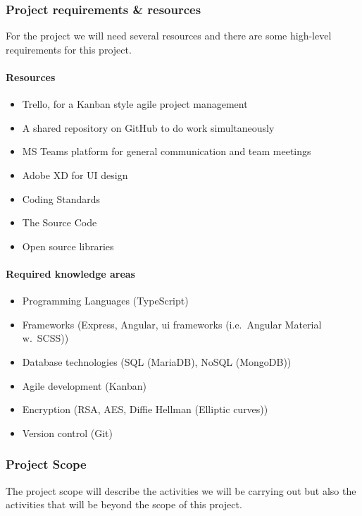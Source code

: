\subsubsection{Project requirements \& resources}

For the project we will need several resources and there are some high-level requirements for this project.

\paragraph{Resources}
\begin{itemize}
    \item Trello, for a Kanban style agile project management
    \item A shared repository on GitHub to do work simultaneously
    \item MS Teams platform for general communication and team meetings
    \item Adobe XD for UI design
    \item Coding Standards
    \item The Source Code
    \item Open source libraries
\end{itemize}

\paragraph{Required knowledge areas}
\begin{itemize}
    \item Programming Languages (TypeScript)
    \item Frameworks (Express, Angular, \ac{ui} frameworks (i.e.\ Angular Material w.\ SCSS))
    \item Database technologies (SQL (MariaDB), NoSQL (MongoDB))
    \item Agile development (Kanban)
    \item Encryption (RSA, AES, Diffie Hellman (Elliptic curves))
    \item Version control (Git)
\end{itemize}

\subsubsection{Project Scope}

The project scope will describe the activities we will be carrying out but also the activities that will be beyond the
scope of this project.

